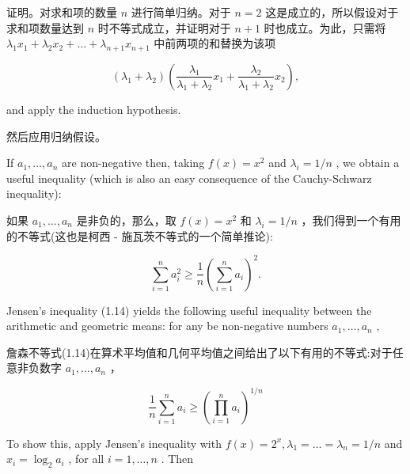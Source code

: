 \documentclass[10pt]{article}
\begin{document}
\begin{tcolorbox}\relax
证明。对求和项的数量 \(n\) 进行简单归纳。对于 \(n = 2\) 这是成立的，所以假设对于求和项数量达到 \(n\) 时不等式成立，并证明对于 \(n + 1\) 时也成立。为此，只需将 \({\lambda }_{1}{x}_{1} + {\lambda }_{2}{x}_{2} + \ldots  + {\lambda }_{n + 1}{x}_{n + 1}\) 中前两项的和替换为该项
\end{tcolorbox}

\[
\left( {{\lambda }_{1} + {\lambda }_{2}}\right) \left( {\frac{{\lambda }_{1}}{{\lambda }_{1} + {\lambda }_{2}}{x}_{1} + \frac{{\lambda }_{2}}{{\lambda }_{1} + {\lambda }_{2}}{x}_{2}}\right) ,
\]

and apply the induction hypothesis.

\begin{tcolorbox}\relax
然后应用归纳假设。
\end{tcolorbox}

If \({a}_{1},\ldots ,{a}_{n}\) are non-negative then, taking \(f\left( x\right)  = {x}^{2}\) and \({\lambda }_{i} = 1/n\) , we obtain a useful inequality (which is also an easy consequence of the Cauchy-Schwarz inequality):

\begin{tcolorbox}\relax
如果 \({a}_{1},\ldots ,{a}_{n}\) 是非负的，那么，取 \(f\left( x\right)  = {x}^{2}\) 和 \({\lambda }_{i} = 1/n\) ，我们得到一个有用的不等式(这也是柯西 - 施瓦茨不等式的一个简单推论):
\end{tcolorbox}

\[
\mathop{\sum }\limits_{{i = 1}}^{n}{a}_{i}^{2} \geq  \frac{1}{n}{\left( \mathop{\sum }\limits_{{i = 1}}^{n}{a}_{i}\right) }^{2}. \tag{1.15}
\]

Jensen's inequality (1.14) yields the following useful inequality between the arithmetic and geometric means: for any be non-negative numbers \({a}_{1},\ldots ,{a}_{n}\) ,

\begin{tcolorbox}\relax
詹森不等式(1.14)在算术平均值和几何平均值之间给出了以下有用的不等式:对于任意非负数字 \({a}_{1},\ldots ,{a}_{n}\) ，
\end{tcolorbox}

\[
\frac{1}{n}\mathop{\sum }\limits_{{i = 1}}^{n}{a}_{i} \geq  {\left( \mathop{\prod }\limits_{{i = 1}}^{n}{a}_{i}\right) }^{1/n} \tag{1.16}
\]

To show this, apply Jensen’s inequality with \(f\left( x\right)  = {2}^{x},{\lambda }_{1} = \ldots  = {\lambda }_{n} = 1/n\) and \({x}_{i} = {\log }_{2}{a}_{i}\) , for all \(i = 1,\ldots ,n\) . Then
\end{document}
